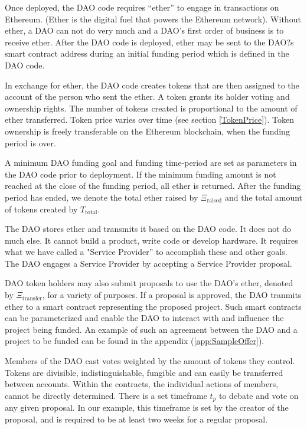 \documentclass[9pt,oneside]{amsart}
\begin{document}
\begin{multicols}{2}
Once deployed, the DAO code requires ``ether'' to engage in transactions on Ethereum.  (Ether is the digital fuel that powers the Ethereum network).  Without ether, a DAO can not do very much and a DAO's first order of business is to receive ether.  After the DAO code is deployed, ether may be sent to the DAO?s smart contract address during an initial funding period which is defined in the DAO code. 

In exchange for ether, the DAO code creates tokens that are then assigned to the account of the person who sent the ether.  A token grants its holder voting and ownership rights.  The number of tokens created is proportional to the amount of ether transferred.  Token price varies over time (see section \ref{TokenPrice}). Token ownership is freely transferable on the Ethereum blockchain, when the funding period is over.

A minimum DAO funding goal and funding time-period are set as parameters in the DAO code prior to deployment.  If the minimum funding amount is not reached at the close of the funding period, all ether is returned. After the funding period has ended, we denote the total ether raised by $\Xi_{\text{raised}}$ and the total amount of tokens created by $T_{\text{total}}$. 

The DAO stores ether and transmits it based on the DAO code. It does not do much else.  It cannot build a product, write code or develop hardware.  It requires what we have called a "Service Provider'' to accomplish these and other goals.  The DAO engages a Service Provider by accepting a Service Provider proposal. 

DAO token holders may also submit proposals to use the DAO's ether, denoted by $\Xi_{\text{transfer}}$, for a variety of purposes.  If a proposal is approved, the DAO tranmits ether to a smart contract representing the proposed project. Such smart contracts can be parameterized and enable the DAO to interact with and influence the project being funded.
An example of such an agreement between the DAO and a project to be funded can be found in the appendix (\ref{app:SampleOffer}).

Members of the DAO cast votes weighted by the amount of tokens they control.  Tokens are divisible, indistinguishable, fungible and can easily be transferred between accounts. Within the contracts, the individual actions of members, cannot be directly determined. There is a set timeframe $t_p$ to debate and vote on any given proposal. In our example, this timeframe is set by the creator of the proposal, and is required to be at least two weeks for a regular proposal.


\end{multicols}
\end{document}

